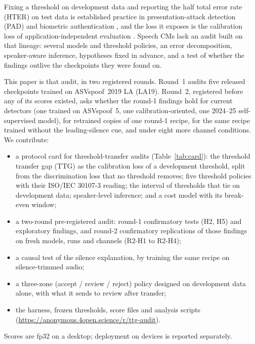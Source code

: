 \documentclass[journal]{IEEEtran}
\newcommand{\todo}[1]{\textcolor{red}{[#1]}}
\newcommand{\repo}{\url{https://anonymous.4open.science/r/ttg-audit}}
\newcommand{\repo}{\todo{public repository URL}}
\begin{document}
Fixing a threshold on development data and reporting the half total error rate (HTER) on test data is established practice
in presentation-attack detection (PAD) \cite{chingovska12_lbp,korshunov16_crossdb} and biometric authentication
\cite{bengio04_hter}, and the loss it exposes is the calibration loss of application-independent evaluation
\cite{brummer06_calibration,vanleeuwen07_intro}. Speech CMs lack an audit built on that lineage: several models and
threshold policies, an error decomposition, speaker-aware inference, hypotheses fixed in advance, and a test of whether the
findings outlive the checkpoints they were found on.

This paper is that audit, in two registered rounds. Round~1 audits five released checkpoints trained on ASVspoof~2019 LA
(LA19). Round~2, registered before any of its scores existed, asks whether the round-1 findings hold for current detectors
(one trained on ASVspoof~5, one calibration-oriented, one 2024--25 self-supervised model), for retrained copies of one
round-1 recipe, for the same recipe trained without the leading-silence cue, and under eight more channel conditions.
We contribute:
\begin{itemize}
\item a protocol card for threshold-transfer audits (Table~\ref{tab:card}): the threshold transfer gap (TTG) as the
calibration loss of a development threshold, split from the discrimination loss that no threshold removes; five threshold
policies with their ISO/IEC 30107-3 reading; the interval of thresholds that tie on development data; speaker-level
inference; and a cost model with its break-even window;
\item a two-round pre-registered audit: round-1 confirmatory tests (H2, H5) and exploratory findings, and round-2
confirmatory replications of those findings on fresh models, runs and channels (R2-H1 to R2-H4);
\item a causal test of the silence explanation, by training the same recipe on silence-trimmed audio;
\item a three-zone (accept / review / reject) policy designed on development data alone, with what it sends to review
after transfer;
\item the harness, frozen thresholds, score files and analysis scripts (\repo).
\end{itemize}
Scores are fp32 on a desktop; deployment on devices is reported separately.

\end{document}
